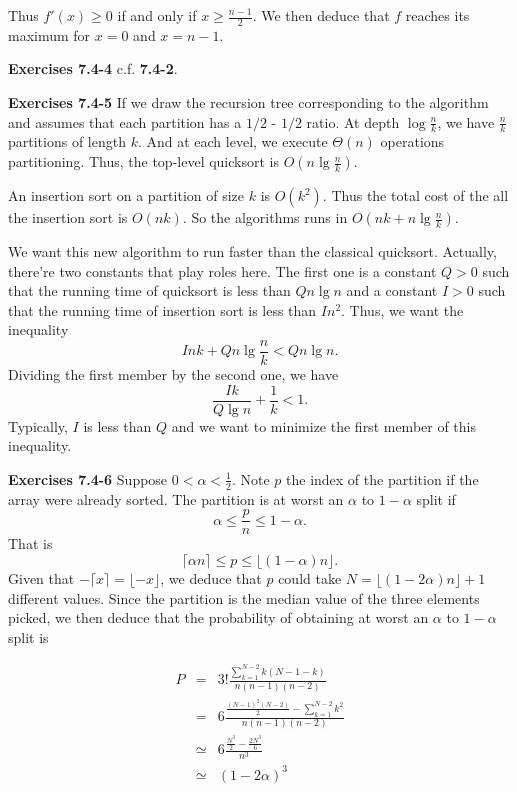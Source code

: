 \documentclass[a4paper,12pt]{article}
\newcommand{\newpar}[1]
{\bigskip \noindent \textbf{Exercises #1} \newline}
\begin{document}
Thus $f'(x) \ge 0$ if and only if $x \ge \frac{n-1}{2}$.  We then
deduce that $f$ reaches its maximum for $x = 0$ and $x = n-1$.

\newpar{7.4-4}
c.f. \textbf{7.4-2}.

\newpar{7.4-5}
If we draw the recursion tree corresponding to the algorithm and
assumes that each partition has a $1/2$ - $1/2$ ratio.  At depth $\log
\frac{n}{k}$, we have $\frac{n}{k}$ partitions of length $k$.  And at
each level,  we execute $\Theta(n)$ operations partitioning.  Thus,
the top-level quicksort is $O\left(n \lg \frac{n}{k}\right)$.

An insertion sort on a partition of size $k$ is $O(k^2)$.  Thus the
total cost of the all the insertion sort is $O(n k)$.  So the
algorithms runs in $O\left(nk + n \lg \frac{n}{k}\right)$.

We want this new algorithm to run faster than the classical quicksort.
Actually, there're two constants that play roles here.  The first one
is a constant $Q > 0$ such that the running time of quicksort is less
than $Q n \lg n$ and a constant $I > 0$ such that the running time of
insertion sort is less than $I n^2$.  Thus, we want the inequality
\[ I nk + Q n \lg \frac{n}{k} < Q n \lg n.\]
Dividing the first member by the second one, we have
\[ \frac{I k}{Q \lg n} + \frac{1}{k} < 1.\]
Typically, $I$ is less than $Q$ and we want to minimize the first
member of this inequality.

\newpar{7.4-6}
Suppose $0 < \alpha < \frac{1}{2}$.  Note $p$ the index of the
partition if the array were already sorted.  The partition is at worst
an $\alpha$ to $1-\alpha$ split if
\[ \alpha \le \frac{p}{n} \le 1-\alpha.\]
That is
\[ \lceil \alpha n \rceil \le p \le \lfloor (1-\alpha)n\rfloor.\]
Given that $- \lceil x\rceil = \lfloor -x \rfloor$, we deduce that $p$
could take $N = \lfloor (1-2\alpha)n \rfloor + 1$ different values.
Since the partition is the median value of the three elements picked,
we then deduce that the probability of obtaining at worst an $\alpha$
to $1-\alpha$ split is

\begin{eqnarray*}
  P &=& 3!\frac{\sum_{k=1}^{N-2}k(N-1-k)}{n(n-1)(n-2)} \\
  &=& 6 \frac{\frac{(N-1)^2(N-2)}{2} -
    \sum_{k=1}^{N-2}k^2}{n(n-1)(n-2)}\\
  &\simeq& 6 \frac{\frac{N^3}{2} - \frac{2N^3}{6}}{n^3} \\
  &\simeq& (1-2\alpha)^3
\end{eqnarray*}
\end{document}
